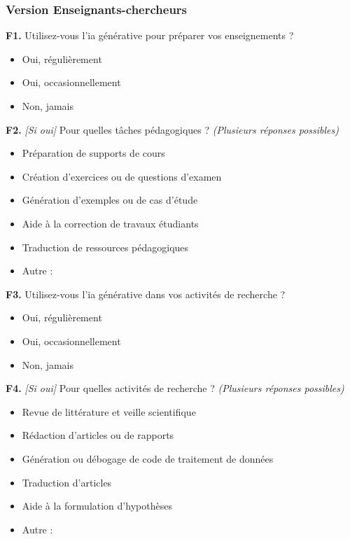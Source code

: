 \subsubsection{Version Enseignants-chercheurs}

\textbf{F1.} Utilisez-vous l'\gls{ia} générative pour préparer vos enseignements ?
\begin{itemize}[label=$\square$, leftmargin=1.5cm]
  \item Oui, régulièrement
  \item Oui, occasionnellement
  \item Non, jamais
\end{itemize}

\textbf{F2.} \textit{[Si oui]} Pour quelles tâches pédagogiques ? \textit{(Plusieurs réponses possibles)}
\begin{itemize}[label=$\square$, leftmargin=1.5cm]
  \item Préparation de supports de cours
  \item Création d'exercices ou de questions d'examen
  \item Génération d'exemples ou de cas d'étude
  \item Aide à la correction de travaux étudiants
  \item Traduction de ressources pédagogiques
  \item Autre : \underline{\hspace{4cm}}
\end{itemize}

\textbf{F3.} Utilisez-vous l'\gls{ia} générative dans vos activités de recherche ?
\begin{itemize}[label=$\square$, leftmargin=1.5cm]
  \item Oui, régulièrement
  \item Oui, occasionnellement
  \item Non, jamais
\end{itemize}

\textbf{F4.} \textit{[Si oui]} Pour quelles activités de recherche ? \textit{(Plusieurs réponses possibles)}
\begin{itemize}[label=$\square$, leftmargin=1.5cm]
  \item Revue de littérature et veille scientifique
  \item Rédaction d'articles ou de rapports
  \item Génération ou débogage de code de traitement de données
  \item Traduction d'articles
  \item Aide à la formulation d'hypothèses
  \item Autre : \underline{\hspace{4cm}}
\end{itemize}

